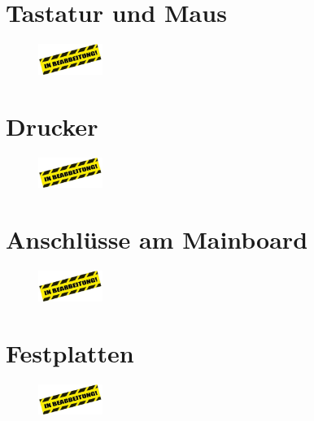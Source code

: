 \documentclass[a4paper]{article}
\begin{document}
    \section{Tastatur und Maus}\label{sec:tastatur-und-maus}
    \begin{center}
        \begin{figure}[H]
            \centering
            \includegraphics[height=1cm]{media/s_111}\label{fig:bearb}
        \end{figure}
    \end{center}
    \section{Drucker}\label{sec:drucker}
    \begin{center}
        \begin{figure}[H]
            \centering
            \includegraphics[height=1cm]{media/s_111}\label{fig:bearb2}
        \end{figure}
    \end{center}

    \section{Anschlüsse am Mainboard}\label{sec:anschlüsse-am-mainboard}
    \begin{center}
        \begin{figure}[H]
            \centering
            \includegraphics[height=1cm]{media/s_111}\label{fig:bearb3}
        \end{figure}
    \end{center}

    \section{Festplatten}\label{sec:festplatten}

    \begin{center}
        \begin{figure}[H]
            \centering
            \includegraphics[height=1cm]{media/s_111}\label{fig:bearb4}
        \end{figure}
    \end{center}
\end{document}
